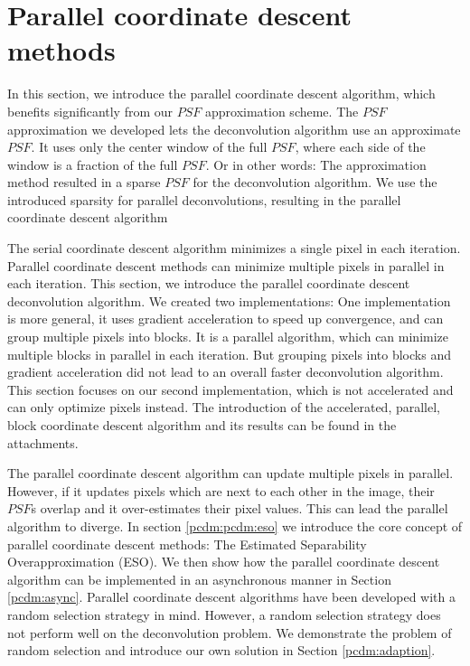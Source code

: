 \section{Parallel coordinate descent methods}\label{pcdm}
In this section, we introduce the parallel coordinate descent algorithm, which benefits significantly from our $PSF$ approximation scheme. The $PSF$ approximation we developed lets the deconvolution algorithm use an approximate $PSF$. It uses only the center window of the full $PSF$, where each side of the window is a fraction of the full $PSF$. Or in other words: The approximation method resulted in a sparse $PSF$ for the deconvolution algorithm. We use the introduced sparsity for parallel deconvolutions, resulting in the parallel coordinate descent algorithm

The serial coordinate descent algorithm minimizes a single pixel in each iteration. Parallel coordinate descent methods can minimize multiple pixels in parallel in each iteration. This section, we introduce the parallel coordinate descent deconvolution algorithm. We created two implementations: One implementation is more general, it uses gradient acceleration to speed up convergence, and can group multiple pixels into blocks. It is a parallel algorithm, which can minimize multiple blocks in parallel in each iteration. But grouping pixels into blocks and gradient acceleration did not lead to an overall faster deconvolution algorithm. This section focuses on our second implementation, which is not accelerated and can only optimize pixels instead. The introduction of the accelerated, parallel, block coordinate descent algorithm and its results can be found in the attachments.

The parallel coordinate descent algorithm can update multiple pixels in parallel. However, if it updates pixels which are next to each other in the image, their $PSF$s overlap and it over-estimates their pixel values. This can lead the parallel algorithm to diverge. In section \ref{pcdm:pcdm:eso} we introduce the core concept of parallel coordinate descent methods: The Estimated Separability Overapproximation (ESO). We then show how the parallel coordinate descent algorithm can be implemented in an asynchronous manner in Section \ref{pcdm:async}. Parallel coordinate descent algorithms have been developed with a random selection strategy in mind. However, a random selection strategy does not perform well on the deconvolution problem. We demonstrate the problem of random selection and introduce our own solution in Section \ref{pcdm:adaption}.


